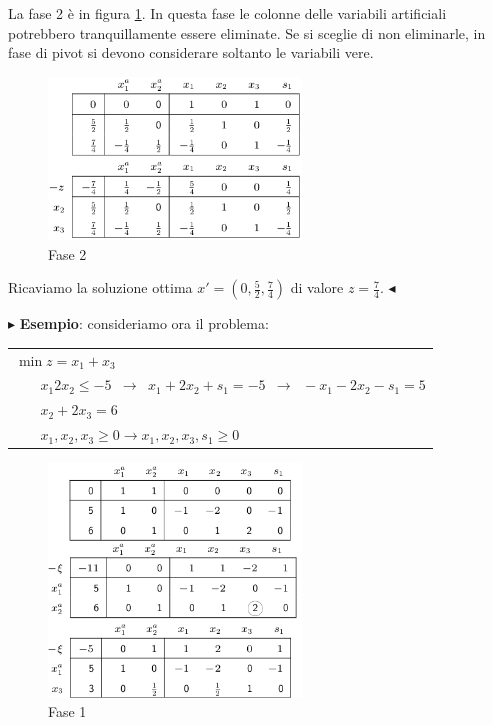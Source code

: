 \documentclass[11pt]{book}
\begin{document}
La fase 2 \`e in figura \ref{cap4fase2}. In questa fase le colonne
delle variabili artificiali potrebbero tranquillamente essere
eliminate. Se si sceglie di non eliminarle, in fase di pivot si devono
considerare soltanto le variabili vere.

\begin{figure}[h!]
  \centering
  \includegraphics[width=0.6\textwidth]{images/cap4fase2.png}
  \caption{Fase 2}
  \label{cap4fase2}
\end{figure}

Ricaviamo la soluzione ottima $x' = (0, \frac{5}{2}, \frac{7}{4})$ di
valore $z = \frac{7}{4}$. $\blacktriangleleft$
\vspace{11pt}

\vspace{11pt}
$\blacktriangleright$ {\bf Esempio}: consideriamo ora il problema:

\vspace{11pt}
\begin{center}
  \begin{tabular}{l}
    $\min z = x_1 + x_3$\\
    $\phantom{min}x_1  2x_2 \leq -5\phantom{a}\rightarrow\phantom{a}x_1 + 2x_2 + s_1 = -5\phantom{a}\rightarrow\phantom{a} -x_1 - 2x_2 -s_1 = 5$\\
    $\phantom{min}x_2 + 2x_3 = 6$\\
    $\phantom{min}x_1, x_2, x_3 \geq 0 \rightarrow x_1,x_2,x_3,s_1 \geq 0$\\
  \end{tabular}
\end{center}
\vspace{11pt}

\begin{figure}[h!]
  \centering
  \includegraphics[width=0.6\textwidth]{images/cap4fase1es2.png}
  \caption{Fase 1}
  \label{cap4fase1es2}
\end{figure}
\end{document}
